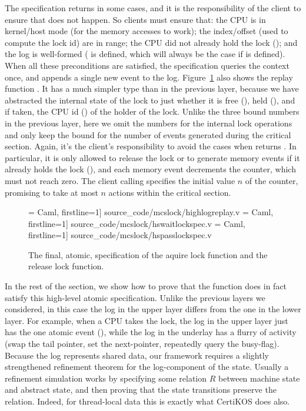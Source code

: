 The specification returns  in some
cases, and it is the
responsibility of the client to ensure  that does not
happen. So clients must ensure that: the CPU is in kernel/host
mode (for the memory accesses to work); the index/offset (used to
compute the lock id) are in range; the CPU did not already hold the
lock (); and the log is well-formed
( is defined, which will always be the case if
 is defined).  When all these preconditions are
satisfied, the specification queries the context once, and appends a
single new  event to the log.
Figure~\ref{fig:chapter:mcslock:hswaitlockspec} also shows the replay function
.
It has a much simpler type than  in the
previous layer, because we have abstracted the internal state of the lock
to just whether it is free (),
held (), and if taken, the CPU id ()
of the holder of the lock. Unlike the three bound numbers in the
previous layer, here we omit the numbers for the internal lock
operations and only keep the bound  for the number
of events generated during the critical section. Again, it's the
client's responsibility to avoid the cases when 
returns . In particular, it is only allowed to release
the lock or to generate memory events if it already holds the lock
(), and each memory event decrements the counter,
which must not reach zero. The client calling 
specifies the initial value $n$ of the counter, promising to take at
most $n$ actions within the critical section.


\begin{figure}
 = Caml, firstline=1] {source_code/mcslock/highlogreplay.v}
 = Caml, firstline=1] {source_code/mcslock/hswaitlockspec.v}
 = Caml, firstline=1] {source_code/mcslock/hspasslockspec.v}
\caption{The final, atomic, specification of the aquire lock function and the release lock function.}
\label{fig:chapter:mcslock:hswaitlockspec}
\end{figure}


In the rest of the section, we show how to prove that the function
does in fact satisfy this high-level atomic specification.
Unlike the previous layers we considered, in this case the log in the
upper layer differs from the one in the lower layer. For example, when
a CPU takes the lock, the log in the upper layer just has the one
atomic event (), while the log in the underlay
has a flurry of activity (swap the tail pointer, set the next-pointer,
repeatedly query the busy-flag).
Because the log represents shared data, our framework requires a
slightly strengthened refinement theorem for the log-component of the
state. Usually a refinement simulation works by specifying some
relation $R$ between machine state and abstract state, and then
proving that the state transitions preserve the relation. Indeed, for
thread-local data this is exactly what CertiKOS does also.


